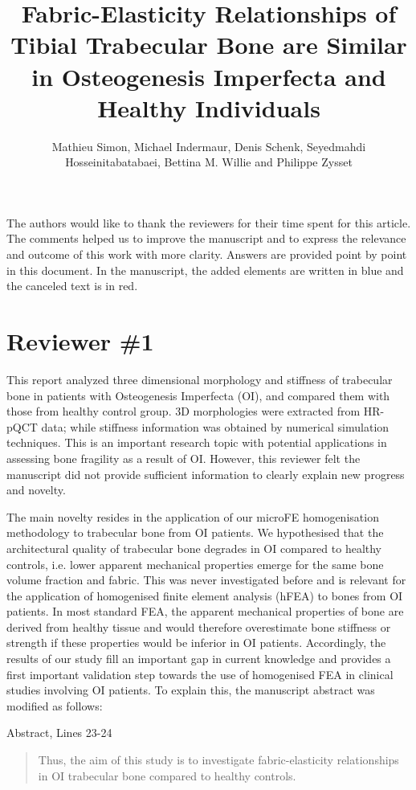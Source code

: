 \documentclass{AR2RC}
\title{Fabric-Elasticity Relationships of Tibial Trabecular Bone are Similar in Osteogenesis Imperfecta and Healthy Individuals}
\author{Mathieu Simon, Michael Indermaur, Denis Schenk, Seyedmahdi Hosseinitabatabaei, Bettina	M. Willie and Philippe Zysset}
\begin{document}
\maketitle

\vspace{1em}The authors would like to thank the reviewers for their time spent for this article. The comments helped us to improve the manuscript and to express the relevance and outcome of this work with more clarity. Answers are provided point by point in this document. In the manuscript, the added elements are written in blue and the canceled text is in red.

\section{Reviewer \#1}

\RC This report analyzed three dimensional morphology and stiffness of trabecular bone in patients with Osteogenesis Imperfecta (OI), and compared them with those from healthy control group. 3D morphologies were extracted from HR-pQCT data; while stiffness information was obtained by numerical simulation techniques. This is an important research topic with potential applications in assessing bone fragility as a result of OI. However, this reviewer felt the manuscript did not provide sufficient information to clearly explain new progress and novelty.

\AR The main novelty resides in the application of our microFE homogenisation methodology to trabecular bone from OI patients. We hypothesised that the architectural quality of trabecular bone degrades in OI compared to healthy controls, i.e. lower apparent mechanical properties emerge for the same bone volume fraction and fabric. This was never investigated before and is relevant for the application of homogenised finite element analysis (hFEA) to bones from OI patients. In most standard FEA, the apparent mechanical properties of bone are derived from healthy tissue and would therefore overestimate bone stiffness or strength if these properties would be inferior in OI patients. Accordingly, the results of our study fill an important gap in current knowledge and provides a first important validation step towards the use of homogenised FEA in clinical studies involving OI patients. To explain this, the manuscript abstract was modified as follows:\par

Abstract, Lines 23-24
\begin{quote}
	Thus, the aim of this study is to investigate fabric-elasticity relationships in OI trabecular bone compared to healthy controls.
\end{quote}
\end{document}
